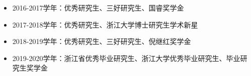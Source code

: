 \begin{publications}
\begin{itemize}
    
\item 2016-2017学年：优秀研究生、三好研究生、国睿奖学金

\item 2017-2018学年：优秀研究生、浙江大学博士研究生学术新星

\item 2018-2019学年：优秀研究生、三好研究生、倪继红奖学金

\item 2019-2020学年：浙江省优秀毕业研究生、浙江大学优秀毕业研究生、毕业研究生奖学金

\end{itemize}

\end{publications}
